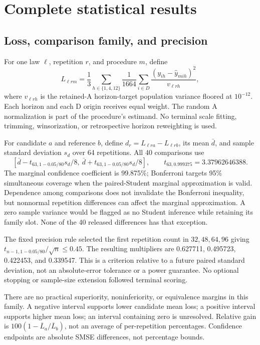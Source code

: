 \section{Complete statistical results}\label{sup:results}
\subsection{Loss, comparison family, and precision}
For one law $\ell$, repetition $r$, and procedure $m$, define
\[
 L_{\ell rm}=\frac13\sum_{h\in\{1,4,12\}}\frac{1}{1664}
 \sum_{i\in D}\frac{(y_{ih}-\widehat y_{mih})^2}{v_{\ell rh}},
\]
where $v_{\ell rh}$ is the retained-A horizon-target population variance floored at $10^{-12}$. Each horizon and each D origin receives equal weight. The random A normalization is part of the procedure's estimand. No terminal scale fitting, trimming, winsorization, or retrospective horizon reweighting is used.

For candidate $a$ and reference $b$, define $d_r=L_{\ell ra}-L_{\ell rb}$, its mean $\bar d$, and sample standard deviation $s_d$ over 64 repetitions. All 40 comparisons use
\[
 [\bar d-t_{63,1-0.05/80}s_d/8,\ \bar d+t_{63,1-0.05/80}s_d/8],
 \qquad t_{63,0.999375}=3.37962646388.
\]
The marginal confidence coefficient is 99.875\%; Bonferroni targets 95\% simultaneous coverage when the paired-Student marginal approximation is valid. Dependence among comparisons does not invalidate the Bonferroni inequality, but nonnormal repetition differences can affect the marginal approximation. A zero sample variance would be flagged as no Student inference while retaining its family slot. None of the 40 released differences has that exception.

The fixed precision rule selected the first repetition count in $32,48,64,96$ giving $t_{n-1,1-0.05/80}/\sqrt n\leq0.45$. The resulting multipliers are 0.627711, 0.495723, 0.422453, and 0.339547. This is a criterion relative to a future paired standard deviation, not an absolute-error tolerance or a power guarantee. No optional stopping or sample-size extension followed terminal scoring.

There are no practical superiority, noninferiority, or equivalence margins in this family. A negative interval supports lower candidate mean loss; a positive interval supports higher mean loss; an interval containing zero is unresolved. Relative gain is $100(1-\overline L_a/\overline L_b)$, not an average of per-repetition percentages. Confidence endpoints are absolute SMSE differences, not percentage bounds.

